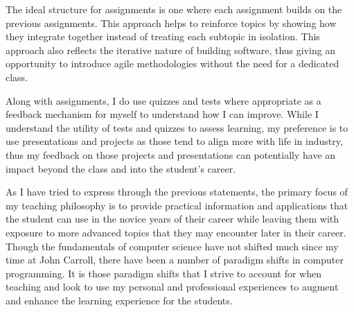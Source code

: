 \documentclass[12pt]{article}
\begin{document}
The ideal structure for assignments is one where each assignment builds on the previous assignments.  This approach helps to reinforce topics by showing how they integrate together instead of treating each subtopic in isolation.  This approach also reflects the iterative nature of building software, thus giving an opportunity to introduce agile methodologies without the need for a dedicated class.  

Along with assignments, I do use quizzes and tests where appropriate as a feedback mechanism for myself to understand how I can improve.  While I understand the utility of tests and quizzes to assess learning, my preference is to use presentations and projects as those tend to align more with life in industry, thus my feedback on those projects and presentations can potentially have an impact beyond the class and into the student's career.

As I have tried to express through the previous statements, the primary focus of my teaching philosophy is to provide practical information and applications that the student can use in the novice years of their career while leaving them with exposure to more advanced topics that they may encounter later in their career.  Though the fundamentals of computer science have not shifted much since my time at John Carroll, there have been a number of paradigm shifts in computer programming.  It is those paradigm shifts that I strive to account for when teaching and look to use my personal and professional experiences to augment and enhance the learning experience for the students.
\end{document}
